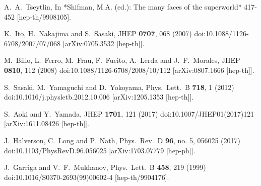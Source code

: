 \documentclass[a4paper,11pt]{article}
\begin{document}
\begin{thebibliography}{99}
  A.~A.~Tseytlin,
  In *Shifman, M.A. (ed.): The many faces of the superworld* 417-452
  [hep-th/9908105].


  K.~Ito, H.~Nakajima and S.~Sasaki,
  JHEP {\bf 0707}, 068 (2007)
  doi:10.1088/1126-6708/2007/07/068
  [arXiv:0705.3532 [hep-th]].


  M.~Billo, L.~Ferro, M.~Frau, F.~Fucito, A.~Lerda and J.~F.~Morales,
  JHEP {\bf 0810}, 112 (2008)
  doi:10.1088/1126-6708/2008/10/112
  [arXiv:0807.1666 [hep-th]].


  S.~Sasaki, M.~Yamaguchi and D.~Yokoyama,
  Phys.\ Lett.\ B {\bf 718}, 1 (2012)
  doi:10.1016/j.physletb.2012.10.006
  [arXiv:1205.1353 [hep-th]].


  S.~Aoki and Y.~Yamada,
  JHEP {\bf 1701}, 121 (2017)
  doi:10.1007/JHEP01(2017)121
  [arXiv:1611.08426 [hep-th]].


  J.~Halverson, C.~Long and P.~Nath,
  Phys.\ Rev.\ D {\bf 96}, no. 5, 056025 (2017)
  doi:10.1103/PhysRevD.96.056025
  [arXiv:1703.07779 [hep-ph]].


  J.~Garriga and V.~F.~Mukhanov,
  Phys.\ Lett.\ B {\bf 458}, 219 (1999)
  doi:10.1016/S0370-2693(99)00602-4
  [hep-th/9904176].



\end{thebibliography}
\end{document}
